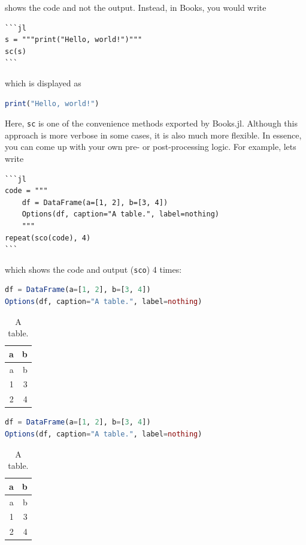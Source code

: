 \documentclass[
  notoc %
]{tufte-book}
\newcommand{\passthrough}[1]{#1}
\begin{document}
shows the code and not the output. Instead, in Books, you would write

\begin{lstlisting}
```jl
s = """print("Hello, world!")"""
sc(s)
```
\end{lstlisting}

which is displayed as

\begin{lstlisting}[language=Julia]
print("Hello, world!")
\end{lstlisting}

Here, \passthrough{\lstinline!sc!} is one of the convenience methods
exported by Books.jl. Although this approach is more verbose in some
cases, it is also much more flexible. In essence, you can come up with
your own pre- or post-processing logic. For example, lets write

\begin{lstlisting}
```jl
code = """
    df = DataFrame(a=[1, 2], b=[3, 4])
    Options(df, caption="A table.", label=nothing)
    """
repeat(sco(code), 4)
```
\end{lstlisting}

which shows the code and output (\passthrough{\lstinline!sco!}) 4 times:

\begin{lstlisting}[language=Julia]
df = DataFrame(a=[1, 2], b=[3, 4])
Options(df, caption="A table.", label=nothing)
\end{lstlisting}

\begin{longtable}[]{@{}rr@{}}
\caption{A table.}\tabularnewline
\toprule()
a & b \\
\midrule()
\endfirsthead
\toprule()
a & b \\
\midrule()
\endhead
1 & 3 \\
2 & 4 \\
\bottomrule()
\end{longtable}

\begin{lstlisting}[language=Julia]
df = DataFrame(a=[1, 2], b=[3, 4])
Options(df, caption="A table.", label=nothing)
\end{lstlisting}

\begin{longtable}[]{@{}rr@{}}
\caption{A table.}\tabularnewline
\toprule()
a & b \\
\midrule()
\endfirsthead
\toprule()
a & b \\
\midrule()
\endhead
1 & 3 \\
2 & 4 \\
\bottomrule()
\end{longtable}
\end{document}
